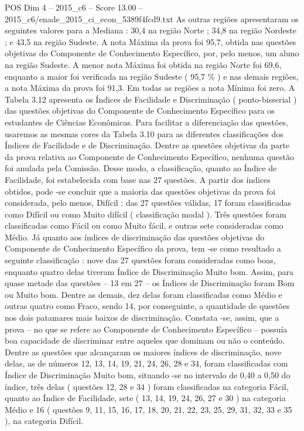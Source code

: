 \begin{textsample}{POS Dim 4 – 2015\_c6 – Score 13.00 – 2015\_c6/enade\_2015\_ci\_econ\_5389f4fcd9.txt}
As outras regiões apresentaram os seguintes valores para a Mediana : 30,4 na região Norte ; 34,8 na região Nordeste ; e 43,5 na região Sudeste.
A nota Máxima da prova foi 95,7, obtida nas questões objetivas do Componente de Conhecimento Específico, por, pelo menos, um aluno na região Sudeste.
A menor nota Máxima foi obtida na região Norte foi 69,6, enquanto a maior foi verificada na região Sudeste ( 95,7 \% ) e nas demais regiões, a nota Máxima da prova foi 91,3.
Em todas as regiões a nota Mínima foi zero.
A Tabela 3.12 apresenta os Índices de Facilidade e Discriminação ( ponto-bisserial ) das questões objetivas do Componente de Conhecimento Específico para os estudantes de Ciências Econômicas.
Para facilitar a diferenciação das questões, usaremos as mesmas cores da Tabela 3.10 para as diferentes classificações dos Índices de Facilidade e de Discriminação.
Dentre as questões objetivas da parte da prova relativa ao Componente de Conhecimento Específico, nenhuma questão foi anulada pela Comissão.
Desse modo, a classificação, quanto ao Índice de Facilidade, foi estabelecida com base nas 27 questões.
A partir dos índices obtidos, pode -se concluir que a maioria das questões objetivas da prova foi considerada, pelo menos, Difícil : das 27 questões válidas, 17 foram classificadas como Difícil ou como Muito difícil ( classificação modal ).
Três questões foram classificadas como Fácil ou como Muito fácil, e outras sete consideradas como Médio.
Já quanto aos índices de discriminação das questões objetivas do Componente de Conhecimento Específico da prova, tem -se como resultado a seguinte classificação : nove das 27 questões foram consideradas como boas, enquanto quatro delas tiveram Índice de Discriminação Muito bom.
Assim, para quase metade das questões – 13 em 27 – os Índices de Discriminação foram Bom ou Muito bom.
Dentre as demais, dez delas foram classificadas como Médio e outras quatro como Fraco, sendo 14, por conseguinte, a quantidade de questões nos dois patamares mais baixos de discriminação.
Constata -se, assim, que a prova – no que se refere ao Componente de Conhecimento Específico – possuía boa capacidade de discriminar entre aqueles que dominam ou não o conteúdo.
Dentre as questões que alcançaram os maiores índices de discriminação, nove delas, as de números 12, 13, 14, 19, 21, 24, 26, 28 e 34, foram classificadas com Índice de Discriminação Muito bom, situando -se no intervalo de 0,40 a 0,50 do índice, três delas ( questões 12, 28 e 34 ) foram classificadas na categoria Fácil, quanto ao Índice de Facilidade, sete ( 13, 14, 19, 24, 26, 27 e 30 ) na categoria Médio e 16 ( questões 9, 11, 15, 16, 17, 18, 20, 21, 22, 23, 25, 29, 31, 32, 33 e 35 ), na categoria Difícil.

\end{textsample}
